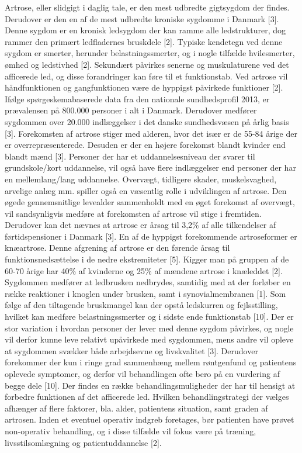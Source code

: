 Artrose, eller slidgigt i daglig tale, er den mest udbredte gigtsygdom der findes. Derudover er den en af de mest udbredte kroniske sygdomme i Danmark [3]. Denne sygdom er en kronisk ledsygdom der kan ramme alle ledstrukturer, dog rammer den primært ledfladernes bruskdele [2]. 
Typiske kendetegn ved denne sygdom er smerter, herunder belastningssmerter, og i nogle tilfælde hvilesmerter, ømhed og ledstivhed  [2]. Sekundært påvirkes senerne og muskulaturene ved det afficerede led, og disse forandringer kan føre til et funktionstab. Ved artrose vil håndfunktionen og gangfunktionen være de hyppigst påvirkede funktioner [2]. 
Ifølge spørgeskemabaserede data fra den nationale sundhedsprofil 2013, er prævalensen på 800.000 personer i alt i Danmark. Derudover medfører sygdommen  over 20.000 indlæggelser i det danske sundhedsvæsen på årlig basis [3]. Forekomsten af artrose stiger med alderen, hvor det især er de 55-84 årige der er overrepræsenterede. Desuden er der en højere forekomst blandt kvinder end blandt mænd [3]. 
Personer der har et uddannelsesniveau der svarer til grundskole/kort uddannelse, vil også have flere indlæggelser end personer der har en mellemlang/lang uddannelse. Overvægt, tidligere skader, muskelsvaghed, arvelige anlæg mm. spiller også en væsentlig rolle i udviklingen af artrose. Den øgede gennemsnitlige levealder sammenholdt med en øget forekomst af overvægt, vil sandsynligvis medføre at  forekomsten af artrose vil stige i fremtiden. Derudover kan det nævnes at artrose er årsag til 3,2\% af alle tilkendelser af førtidspensioner i Danmark [3].
En af de hyppigst forekommende artroseformer er knæartrose. Denne afgrening af artrose er den førende årsag til funktionsnedsættelse i de nedre ekstremiteter [5]. Kigger man på gruppen af de 60-70 årige har 40\% af kvinderne og 25\% af mændene artrose i knæleddet [2].
Sygdommen medfører at ledbrusken nedbrydes, samtidig med at der forløber en række reaktioner i knoglen under brusken, samt i synovialmembranen [1].
 Som følge af den tiltagende bruskmangel kan der opstå ledskurren og fejlsstilling, hvilket kan medføre belastningssmerter og i sidste ende funktionstab [10].  
Der er stor variation i hvordan personer der lever med denne sygdom påvirkes, og nogle vil derfor kunne leve relativt upåvirkede med sygdommen, mens andre vil opleve at sygdommen svækker både arbejdsevne og livskvalitet [3]. Derudover forekommer der kun i ringe grad sammenhæng mellem røntgenfund og patientens oplevede symptomer, og derfor vil behandlingen ofte bero på en vurdering af begge dele [10]. Der findes en række behandlingsmuligheder der har til hensigt at forbedre funktionen af det afficerede led. Hvilken behandlingstrategi der vælges afhænger af flere faktorer, bla.  alder, patientens situation, samt graden af artrosen. Inden et eventuel operativ indgreb foretages, bør patienten have prøvet non-operativ behandling, og i disse tilfælde vil fokus være på træning, livsstilsomlægning og patientuddannelse [2].
